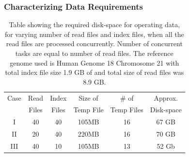 \documentclass{sig-alternate}
\begin{document}
\subsubsection{Characterizing Data Requirements}




\begin{table}
 \begin{tabular}{|c|c|c|c|c|c|} 
 \hline 
Case &Read& Index& Size of&  \# of & Approx.  \\
 &Files &  Files  & Temp File & Temp Files & Disk-space\\
 \hline
I&40 & 40 &105MB & 16 &67 GB \\
II&20 & 40 & 220MB & 16 &70 GB \\
III&40 & 10 & 105MB & 13 &52 Gb \\ 
 \hline
 \end{tabular}

 \caption{Table showing the required disk-space for operating data,
   for varying number of read files and index files, when all the read
   files are processed concurrently.  Number of concurrent tasks are
   equal to number of read files. The reference genome used is Human
   Genome 18 Chromosome 21 with total index file size 1.9 GB of and
   total size of read files was 8.9 GB.}
    \label{table:dynamic-diskspace} 
\end{table}


\end{document}
